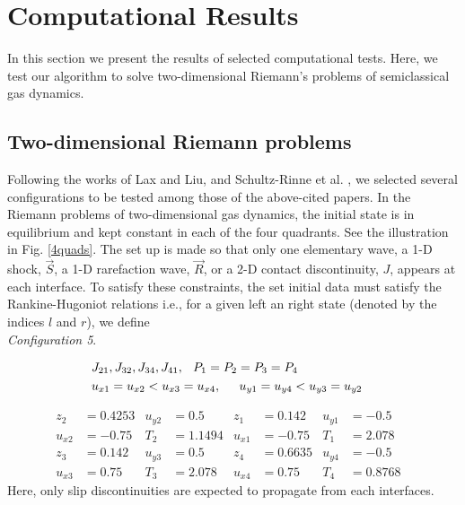 \documentclass{rsproca}%
\begin{document}
\section{Computational Results}
\label{results}

In this section we present the results of selected computational tests.  Here, we test our algorithm to solve two-dimensional Riemann's problems of semiclassical gas dynamics.

\subsection{Two-dimensional Riemann problems}
\label{Riemannp}
Following the works of Lax and Liu, \cite{Laxliu95} and Schultz-Rinne et al. \cite{schultzrinne}, we selected several configurations to be tested among those of the above-cited papers. In the Riemann problems of two-dimensional gas dynamics, the initial state is in equilibrium and kept constant in each of the four quadrants. See the illustration in Fig. \ref{4quads}. The set up is made so that only one elementary wave, a 1-D  shock, $\vec{S}$, a 1-D rarefaction wave, $\vec{R}$, or a 2-D contact discontinuity, $J$, appears at each interface.
To satisfy these constraints, the set initial data must satisfy the Rankine-Hugoniot relations i.e., for a given left an right state (denoted by the indices $l$ and $r$), we define \\

{\em Configuration 5}.

\begin{eqnarray*}
&{J_{21}},J_{32},J_{34},{J_{41}},\hspace{0.1in}P_1=P_2=P_3=P_4&\\
&u_{x1}=u_{x2}<u_{x3}=u_{x4},\hspace{0.2in}u_{y1}=u_{y4}<u_{y3}=u_{y2}&
\label{con5setup}
\end{eqnarray*}

\begin{align*} 
z_2	&=0.4253& 	u_{y2}&=0.5& 	z_1&=0.142& 		u_{y1}&=-0.5& \\
u_{x2}&=-0.75&	T_2&=1.1494& 	u_{x1}&=-0.75& 	T_1&=2.078&		\\
z_3&=0.142&			u_{y3}&=0.5& 	z_4&=0.6635& 		u_{y4}&=-0.5&	\\
u_{x3}&=0.75&		T_3&=2.078& 	u_{x4}&=0.75& 	T_4&=0.8768&
\end{align*}
Here, only slip discontinuities are expected to propagate from each interfaces. \\
\end{document}
